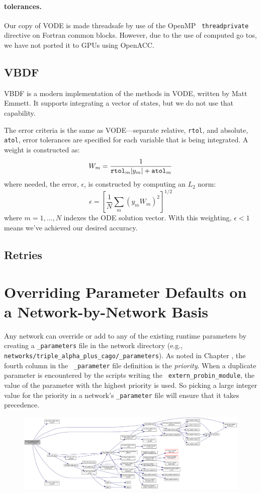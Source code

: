 \paragraph{tolerances.}

Our copy of VODE is made threadsafe by use of the OpenMP {\tt
  threadprivate} directive on Fortran common blocks.  However, due to
the use of computed go tos, we have not ported it to GPUs using
OpenACC.



\subsection{VBDF}
\label{sec:VBDF}

VBDF is a modern implementation of the methods in VODE, written by
Matt Emmett.  It supports integrating a vector of states, but we do
not use that capability.  

The error criteria is the same as VODE---separate relative, {\tt rtol},
and absolute, {\tt atol}, error tolerances are specified for each
variable that is being integrated.  A weight is constructed as:
\begin{equation}
W_m = \frac{1}{{\tt rtol}_m |y_m| + {\tt atol}_m}
\end{equation}
where needed, the error, $\epsilon$, is constructed by computing an $L_2$
norm:
\begin{equation}
\epsilon = \left [ \frac{1}{N} \sum_m (y_m W_m)^2 \right ]^{1/2}
\end{equation}
where $m = 1, \ldots, N$ indexes the ODE solution vector.  With this
weighting, $\epsilon < 1$ means we've achieved our desired accuracy.


\subsection{Retries}



\section{Overriding Parameter Defaults on a Network-by-Network Basis}

Any network can override or add to any of the existing runtime
parameters by creating a {\tt \_parameters} file in the network
directory (e.g., {\tt
  networks/triple\_alpha\_plus\_cago/\_parameters}).  As noted in
Chapter \label{chapter:parameters}, the fourth column in the {\tt
  \_parameter} file definition is the {\em priority}.  When a
duplicate parameter is encountered by the scripts writing the {\tt
  extern\_probin\_module}, the value of the parameter with the highest
priority is used.  So picking a large integer value for the priority
in a network's {\tt \_parameter} file will ensure that it takes
precedence.


\begin{figure}
\centering
\includegraphics[width=\linewidth]{doxygen_network}
\end{figure}
